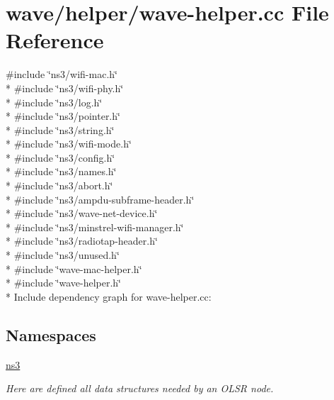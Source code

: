 \hypertarget{wave-helper_8cc}{}\section{wave/helper/wave-\/helper.cc File Reference}
\label{wave-helper_8cc}
{\ttfamily \#include \char`\"{}ns3/wifi-\/mac.\+h\char`\"{}}\\*
{\ttfamily \#include \char`\"{}ns3/wifi-\/phy.\+h\char`\"{}}\\*
{\ttfamily \#include \char`\"{}ns3/log.\+h\char`\"{}}\\*
{\ttfamily \#include \char`\"{}ns3/pointer.\+h\char`\"{}}\\*
{\ttfamily \#include \char`\"{}ns3/string.\+h\char`\"{}}\\*
{\ttfamily \#include \char`\"{}ns3/wifi-\/mode.\+h\char`\"{}}\\*
{\ttfamily \#include \char`\"{}ns3/config.\+h\char`\"{}}\\*
{\ttfamily \#include \char`\"{}ns3/names.\+h\char`\"{}}\\*
{\ttfamily \#include \char`\"{}ns3/abort.\+h\char`\"{}}\\*
{\ttfamily \#include \char`\"{}ns3/ampdu-\/subframe-\/header.\+h\char`\"{}}\\*
{\ttfamily \#include \char`\"{}ns3/wave-\/net-\/device.\+h\char`\"{}}\\*
{\ttfamily \#include \char`\"{}ns3/minstrel-\/wifi-\/manager.\+h\char`\"{}}\\*
{\ttfamily \#include \char`\"{}ns3/radiotap-\/header.\+h\char`\"{}}\\*
{\ttfamily \#include \char`\"{}ns3/unused.\+h\char`\"{}}\\*
{\ttfamily \#include \char`\"{}wave-\/mac-\/helper.\+h\char`\"{}}\\*
{\ttfamily \#include \char`\"{}wave-\/helper.\+h\char`\"{}}\\*
Include dependency graph for wave-\/helper.cc\+:
\subsection*{Namespaces}
\begin{DoxyCompactItemize}
\item 
 \hyperlink{namespacens3}{ns3}
\begin{DoxyCompactList}\small\item\em Here are defined all data structures needed by an O\+L\+SR node. \end{DoxyCompactList}\end{DoxyCompactItemize}
